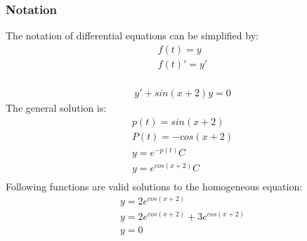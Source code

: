 \subsubsection{Notation}
The notation of differential equations can be simplified by:
\begin{gather*}
   f(t) = y\\
   f(t)' = y'\\
\end{gather*}
\begin{example}
   \begin{gather*}
      y' + sin(x + 2)y = 0
   \end{gather*}
   The general solution is:
   \begin{gather*}
      p(t) = sin(x + 2) \\
      P(t) = - cos(x + 2)\\
      y =  e^{-p(t)} C \\
      y =  e^{cos(x + 2)} C \\
   \end{gather*}
   Following functions are valid solutions to the homogeneous equation:
   \begin{gather*}
      y =  2e^{cos(x + 2)} \\
      y =  2e^{cos(x + 2)} +  3e^{cos(x + 2)} \\
      y = 0 \\
   \end{gather*}
\end{example}
